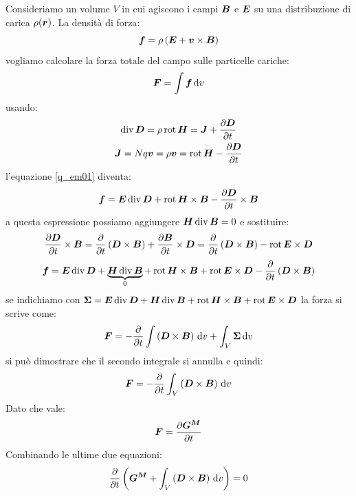 Consideriamo un volume $V$ in cui agiscono i campi $\boldsymbol{B}$ e $\boldsymbol{E}$ su una distribuzione di carica $\rho(\boldsymbol{r})$. La densità di forza:
\begin{equation}
  \boldsymbol{f}=\rho\left(\boldsymbol{E}+\boldsymbol{v}\times\boldsymbol{B}\right)
  \label{q_em01}
\end{equation}
vogliamo calcolare la forza totale del campo sulle particelle cariche:
\begin{equation}
  \boldsymbol{F}=\int \boldsymbol{f}\,\mathrm{d} v
\end{equation}
usando:
\begin{gather}
  \operatorname{div}\boldsymbol{D}=\rho
  \operatorname{rot}\boldsymbol{H}=\boldsymbol{J}+\frac{\partial \boldsymbol{D}}{\partial t}\\
  \boldsymbol{J}=Nq\boldsymbol{v}=\rho\boldsymbol{v}=\operatorname{rot}\boldsymbol{H}-\frac{\partial\boldsymbol{D}}{\partial t}\\
\end{gather}
l'equazione \eqref{q_em01} diventa:
\begin{equation}
  \boldsymbol{f}=\boldsymbol{E}\operatorname{div}\boldsymbol{D}+\operatorname{rot}\boldsymbol{H}\times\boldsymbol{B}-\frac{\partial\boldsymbol{D}}{\partial t}\times\boldsymbol{B}
\end{equation}
a questa espressione possiamo aggiungere $\boldsymbol{H}\operatorname{div}\boldsymbol{B}=0$ e sostituire:
\begin{equation}
  \frac{\partial\boldsymbol{D}}{\partial t}\times\boldsymbol{B}=\frac{\partial}{\partial t}\left(\boldsymbol{D}\times\boldsymbol{B}\right)+\frac{\partial\boldsymbol{B}}{\partial t}\times\boldsymbol{D}=\frac{\partial}{\partial t}\left(\boldsymbol{D}\times\boldsymbol{B}\right)-\operatorname{rot}\boldsymbol{E}\times\boldsymbol{D}
\end{equation}
\begin{equation}
  \boldsymbol{f}=\boldsymbol{E}\operatorname{div}\boldsymbol{D}+\underbrace{\boldsymbol{H}\operatorname{div}\boldsymbol{B}}_{0}+\operatorname{rot}\boldsymbol{H}\times\boldsymbol{B}+\operatorname{rot}\boldsymbol{E}\times\boldsymbol{D}-\frac{\partial}{\partial t}\left(\boldsymbol{D}\times\boldsymbol{B}\right)
\end{equation}
se indichiamo con $\boldsymbol{\Sigma}=\boldsymbol{E}\operatorname{div}\boldsymbol{D}+\boldsymbol{H}\operatorname{div}\boldsymbol{B}+\operatorname{rot}\boldsymbol{H}\times\boldsymbol{B}+\operatorname{rot}\boldsymbol{E}\times\boldsymbol{D}$ la forza si scrive come:
\begin{equation}
  \boldsymbol{F}=-\frac{\partial}{\partial t}\int\left(\boldsymbol{D}\times\boldsymbol{B}\right)\,\mathrm{d} v+\int_V\boldsymbol{\Sigma}\,\mathrm{d} v
\end{equation}
si può dimostrare che il secondo integrale si annulla e quindi:
\begin{equation}
  \boldsymbol{F}=-\frac{\partial}{\partial t}\int_V\left(\boldsymbol{D}\times\boldsymbol{B}\right)\,\mathrm{d} v
\end{equation}
Dato che vale:
\begin{equation}
  \boldsymbol{F}=\frac{\partial\boldsymbol{G^M}}{\partial t}
\end{equation}
Combinando le ultime due equazioni:
\begin{equation}
  \frac{\partial}{\partial t}\left(\boldsymbol{G^M}+\int_V\left(\boldsymbol{D}\times\boldsymbol{B}\right)\,\mathrm{d} v \right)=0
\end{equation}
